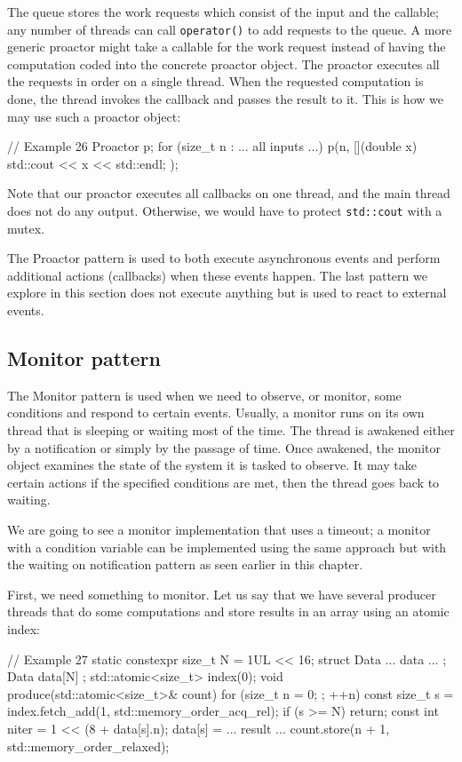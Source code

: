 The queue stores the work requests which consist of the input and the callable; any number of threads can call \texttt{operator()} to add requests to the queue. A more generic proactor might take a callable for the work request instead of having the computation coded into the concrete proactor object. The proactor executes all the requests in order on a single thread. When the requested computation is done, the thread invokes the callback and passes the result to it. This is how we may use such a proactor object:

\begin{code}
// Example 26
Proactor p;
for (size_t n : ... all inputs ...) {
  p(n, [](double x) { std::cout << x << std::endl; });
}
\end{code}

Note that our proactor executes all callbacks on one thread, and the main thread does not do any output. Otherwise, we would have to protect \texttt{std::cout} with a mutex.

The Proactor pattern is used to both execute asynchronous events and perform additional actions (callbacks) when these events happen. The last pattern we explore in this section does not execute anything but is used to react to external events.

\subsection{Monitor pattern}

The Monitor pattern is used when we need to observe, or monitor, some conditions and respond to certain events. Usually, a monitor runs on its own thread that is sleeping or waiting most of the time. The thread is awakened either by a notification or simply by the passage of time. Once awakened, the monitor object examines the state of the system it is tasked to observe. It may take certain actions if the specified conditions are met, then the thread goes back to waiting.

We are going to see a monitor implementation that uses a timeout; a monitor with a condition variable can be implemented using the same approach but with the waiting on notification pattern as seen earlier in this chapter.

First, we need something to monitor. Let us say that we have several producer threads that do some computations and store results in an array using an atomic index:

\begin{code}
// Example 27
static constexpr size_t N = 1UL << 16;
struct Data {... data ... };
Data data[N] {};
std::atomic<size_t> index(0);
void produce(std::atomic<size_t>& count) {
  for (size_t n = 0; ; ++n) {
    const size_t s =
      index.fetch_add(1, std::memory_order_acq_rel);
    if (s >= N) return;
    const int niter = 1 << (8 + data[s].n);
    data[s] = ... result ...
    count.store(n + 1, std::memory_order_relaxed);
  }
}
\end{code}

